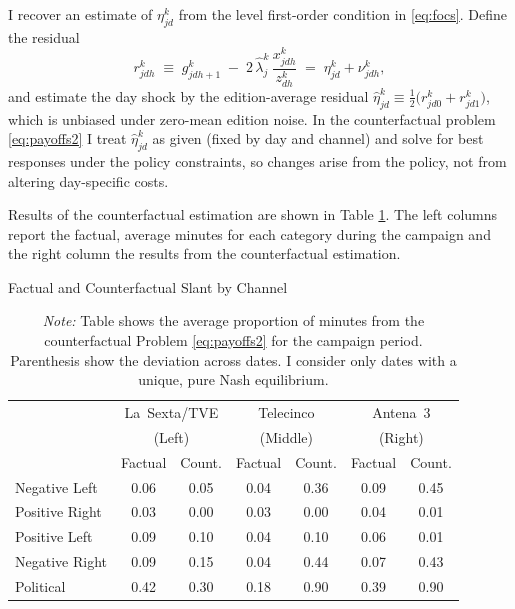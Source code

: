 \documentclass[12pt]{article}
\begin{document}



I recover an estimate of $\eta_{jd}^k$ from the level first-order condition in \eqref{eq:focs}. Define the residual
\[
r_{jdh}^k \;\equiv\; g_{jdh+1}^k \;-\; 2\,\hat\lambda_j^k\,\frac{x_{jdh}^k}{z_{dh}^k}
\;=\; \eta_{jd}^k + \nu_{jdh}^k ,
\]
and estimate the day shock by the edition-average residual
$\hat\eta_{jd}^k \equiv \tfrac{1}{2}\big(r_{jd0}^k+r_{jd1}^k\big)$, which is unbiased under zero-mean edition noise. In the counterfactual problem \eqref{eq:payoffs2} I treat $\hat\eta_{jd}^k$ as given (fixed by day and channel) and solve for best responses under the policy constraints, so changes arise from the policy, not from altering day-specific costs.


Results of the counterfactual estimation are shown in Table \ref{tab:counter}.  The left columns report the factual, average minutes for each category during the campaign and the right column the results from the counterfactual estimation. 



\begin{table}[!htbp]
	\caption{Factual and Counterfactual Slant by Channel}
	\label{tab:counter}
	\centering\small
	\begin{tabular}{lcccccc}
		\toprule
		& \multicolumn{2}{c}{La~Sexta/TVE} & \multicolumn{2}{c}{Telecinco} & \multicolumn{2}{c}{Antena~3} \\
		& \multicolumn{2}{c}{(Left)} & \multicolumn{2}{c}{(Middle)} & \multicolumn{2}{c}{(Right)} \\
		& Factual & Count. & Factual & Count. & Factual & Count. \\
		\midrule
		Negative Left & 0.06 & 0.05 & 0.04 & 0.36 & 0.09 & 0.45 \\
		\midrule
		Positive Right & 0.03 & 0.00 & 0.03 & 0.00 & 0.04 & 0.01 \\
		\midrule
		Positive Left & 0.09 & 0.10 & 0.04 & 0.10 & 0.06 & 0.01 \\
		\midrule
		Negative Right & 0.09 & 0.15 & 0.04 & 0.44 & 0.07 & 0.43 \\
		\midrule
		Political & 0.42 & 0.30 & 0.18 & 0.90 & 0.39 & 0.90 \\
		\midrule
		\bottomrule
	\end{tabular}
	\vspace{0.5em}
	\caption*{\scriptsize\emph{Note:} Table shows the average proportion of minutes from the counterfactual Problem \ref{eq:payoffs2} for the campaign period.  Parenthesis show the deviation across dates. I consider only dates with a unique, pure Nash equilibrium.}
\end{table}
\end{document}
